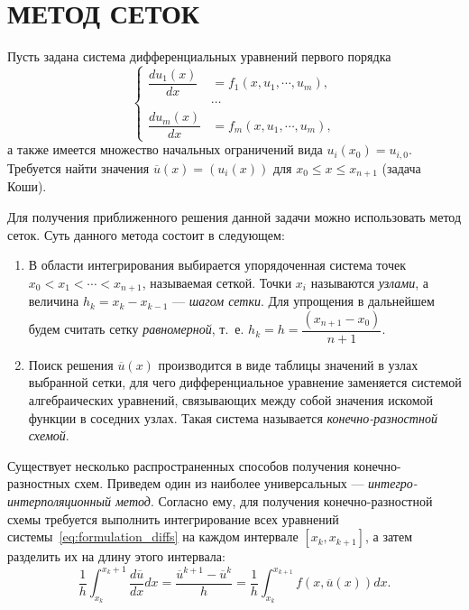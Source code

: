 \section[Метод сеток]{МЕТОД СЕТОК}

Пусть задана система дифференциальных уравнений первого порядка
\begin{equation}
  \left\{\begin{aligned}
    \dfrac{du_1(x)}{dx} &= f_1(x, u_1, \cdots, u_m), \\
    & \cdots \\
    \dfrac{du_m(x)}{dx} &= f_m(x, u_1, \cdots, u_m),
  \end{aligned}
  \right.
  \label{eq:formulation_diffs}
\end{equation}
а также имеется множество начальных ограничений вида
\( u_i(x_0) = u_{i,0} \).
Требуется найти значения \( \overline{u}(x) = (u_i(x)) \) для
\( x_0 \le x \le x_{n+1} \) (задача Коши).

Для получения приближенного решения данной задачи можно использовать метод сеток.
Суть данного метода состоит в следующем:
\begin{enumerate}
\item В области интегрирования выбирается упорядоченная система точек
  \( x_0 < x_1 < \cdots < x_{n+1} \), называемая сеткой.
  Точки \( x_i \) называются \emph{узлами},
  а величина \( h_k = x_k - x_{k-1} \) --- \emph{шагом сетки}.
  Для упрощения в дальнейшем будем считать сетку \emph{равномерной},
  т.~е. \( h_k = h = \dfrac{(x_{n+1} - x_{0})}{n+1} \).
\item Поиск решения \( \overline{u}(x) \) производится в виде
  таблицы значений в узлах выбранной сетки,
  для чего дифференциальное уравнение заменяется системой
  алгебраических уравнений, связывающих между собой значения
  искомой функции в соседних узлах.
  Такая система называется \emph{конечно-разностной схемой}.
\end{enumerate}

Существует несколько распространенных способов получения конечно-разностных схем.
Приведем один из наиболее универсальных --- \emph{интегро-интерполяционный метод}.
Согласно ему, для получения конечно-разностной схемы требуется выполнить
интегрирование всех уравнений системы~\eqref{eq:formulation_diffs}
на каждом интервале \( [x_k, x_{k+1} ]\),
а затем разделить их на длину этого интервала:
\begin{equation}
  \dfrac{1}{h} \int^{x_k+1}_{x_k} \dfrac{d \overline{u}}{dx} dx =
  \dfrac{\overline{u}^{k+1} - \overline{u}^{k}}{h} =
  \dfrac{1}{h} \int^{x_{k+1}}_{x_k} f(x, \overline{u}(x)) dx.
  \label{eq:approximation}
\end{equation}

